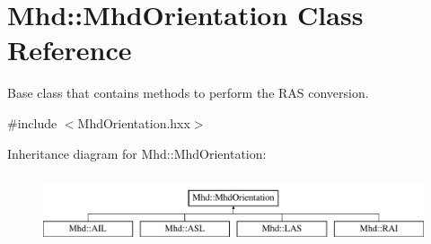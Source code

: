\hypertarget{classMhd_1_1MhdOrientation}{\section{\-Mhd\-:\-:\-Mhd\-Orientation \-Class \-Reference}
\label{classMhd_1_1MhdOrientation}
}


\-Base class that contains methods to perform the \-R\-A\-S conversion.  




{\ttfamily \#include $<$\-Mhd\-Orientation.\-hxx$>$}

\-Inheritance diagram for \-Mhd\-:\-:\-Mhd\-Orientation\-:\begin{figure}[H]
\begin{center}
\leavevmode
\includegraphics[height=2.000000cm]{classMhd_1_1MhdOrientation}
\end{center}
\end{figure}
